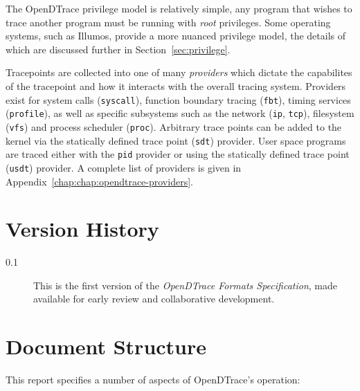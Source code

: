 The OpenDTrace privilege model is relatively simple, any program that
wishes to trace another program must be running with \emph{root}
privileges.  Some operating systems, such as Illumos, provide a more
nuanced privilege model, the details of which are discussed further in
Section~\ref{sec:privilege}.

Tracepoints are collected into one of many \emph{providers} which dictate
the capabilites of the tracepoint and how it interacts with the overall
tracing system.  Providers exist for system calls (\texttt{syscall}),
function boundary tracing (\texttt{fbt}), timing services (\texttt{profile}),
as well as specific subsystems such as the network (\texttt{ip}, \texttt{tcp}),
filesystem (\texttt{vfs}) and process scheduler (\texttt{proc}).
Arbitrary trace points can be added to the kernel via the
statically defined trace point (\texttt{sdt}) provider.  User space programs
are traced either with the \texttt{pid} provider or using the 
statically defined trace point (\texttt{usdt}) provider.  A complete
list of providers is given in Appendix~\ref{chap:chap:opendtrace-providers}.

\section{Version History}

\begin{description}
\item[0.1] This is the first version of the \textit{OpenDTrace Formats
  Specification}, made available for early review and collaborative
  development.
\end{description}

\section{Document Structure}

This report specifies a number of aspects of OpenDTrace's operation:

